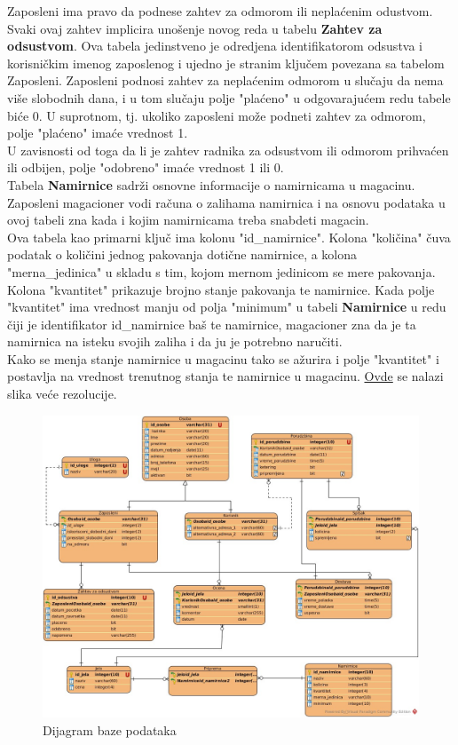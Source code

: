 Zaposleni ima pravo da podnese zahtev za odmorom ili nepla\'cenim odustvom. Svaki ovaj zahtev implicira unošenje novog reda u tabelu \textbf{Zahtev za odsustvom}. Ova tabela jedinstveno je odredjena identifikatorom odsustva i korisničkim imenog zaposlenog i ujedno je stranim klju\v cem povezana sa tabelom Zaposleni. Zaposleni podnosi zahtev za nepla\'cenim odmorom u slučaju da nema više slobodnih dana, i u tom slučaju polje "plaćeno" u odgovarajućem redu tabele biće 0. U suprotnom, tj. ukoliko zaposleni može podneti zahtev za odmorom, polje  "plaćeno" imaće vrednost 1. \\
\indent U zavisnosti od toga da li je zahtev radnika za odsustvom ili odmorom prihvaćen ili odbijen, polje "odobreno" imaće vrednost 1 ili 0. \\

Tabela \textbf{Namirnice} sadrži osnovne informacije o namirnicama u magacinu. Zaposleni magacioner vodi računa o zalihama namirnica i na osnovu podataka u ovoj tabeli zna kada i kojim namirnicama treba snabdeti magacin. \\ 
\indent Ova tabela kao primarni ključ ima kolonu "id\_namirnice". Kolona "količina" čuva podatak o količini  jednog pakovanja dotične namirnice, a kolona "merna\_jedinica"
u skladu s tim, kojom mernom jedinicom se mere pakovanja. Kolona "kvantitet" prikazuje brojno stanje pakovanja te namirnice.
Kada polje "kvantitet" ima vrednost manju od polja "minimum" u tabeli \textbf{Namirnice} u redu čiji je identifikator id\_namirnice baš te namirnice, magacioner zna da je ta namirnica na isteku svojih zaliha i da ju je potrebno naručiti. \\
\indent Kako se menja stanje namirnice u magacinu tako se ažurira i polje "kvantitet" i postavlja na vrednost trenutnog stanja te namirnice u maga\-cinu.
\href{https://raw.githubusercontent.com/JelenaCosic1994/Porucivanje_hrane/master/slike/Baza.jpg}{Ovde} se nalazi slika veće rezolucije.

\begin{figure}[!h]
    \leavevmode
    \begin{center}
    \includegraphics[width=1.1\textwidth]{slike/Baza.jpg}
    \end{center}
    \caption{Dijagram baze podataka}
    \label{fig:slika_baza}
\end{figure}
\leavevmode
